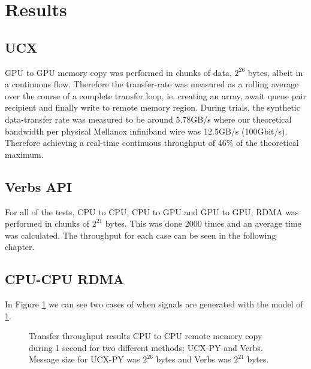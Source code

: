 \documentclass[a4paper,onecolumn]{article}
\begin{document}
\section{Results}

\subsection{UCX}
GPU to GPU memory copy was performed in chunks of data, $2^{26}$ bytes, albeit in a continuous flow. Therefore the transfer-rate was measured as a rolling average over the course of a complete transfer loop, ie. creating an array, await queue pair recipient and finally write to remote memory region. During trials, the synthetic data-transfer rate was measured to be around 5.78GB/s where our theoretical bandwidth per physical Mellanox infiniband wire was 12.5GB/s (100Gbit/s). Therefore achieving a real-time continuous throughput of 46\% of the theoretical maximum.
\subsection{Verbs API}
For all of the tests, CPU to CPU, CPU to GPU and GPU to GPU, RDMA was performed in chunks of $2^{21}$ bytes. This was done 2000 times and an average time was calculated. The throughput for each case can be seen in the following chapter. 



\subsection{CPU-CPU RDMA}
In Figure \ref{cpu-cpu-demo} we can see two cases of when signals are generated with the model of \ref{cpu-cpu-demo}.

\begin{figure}[H]
\begin{center}
\caption{Transfer throughput results CPU to CPU remote memory copy during 1 second for two different methods: UCX-PY and Verbs. Message size for UCX-PY was $2^{26}$ bytes and Verbs was $2^{21}$ bytes.}
\label{cpu-cpu-demo}
\end{center}
\end{figure}
\end{document}
